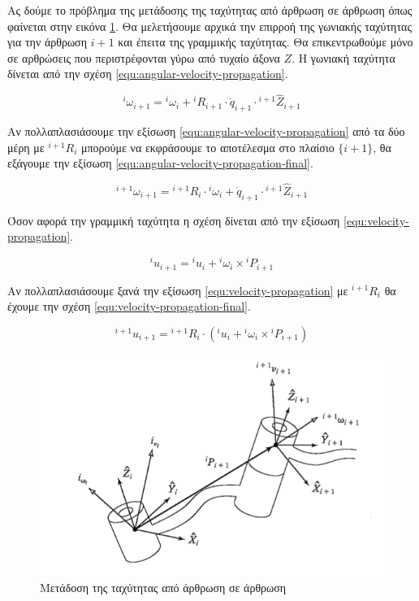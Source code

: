 Ας δούμε το πρόβλημα της μετάδοσης της ταχύτητας από άρθρωση σε άρθρωση όπως φαίνεται στην εικόνα \ref{fig:velocity-transfer}. Θα μελετήσουμε αρχικά την επιρροή της γωνιακής ταχύτητας για την άρθρωση $i+1$ και έπειτα της γραμμικής ταχύτητας. Θα επικεντρωθούμε μόνο σε αρθρώσεις που περιστρέφονται γύρω από τυχαίο άξονα $Ζ$. Η γωνιακή ταχύτητα δίνεται από την σχέση \ref{equ:angular-velocity-propagation}.

\begin{equation}
    ^i\omega_{i+1} = {}^i\omega_i + {}^iR_{i+1} \cdot \dot{q}_{i+1}
    \cdot {}^{i+1}\hat{Z}_{i+1}
    \label{equ:angular-velocity-propagation}
\end{equation}

Αν πολλαπλασιάσουμε την εξίσωση \ref{equ:angular-velocity-propagation} από τα δύο μέρη με $^{i+1}R_i$ μπορούμε να εκφράσουμε το αποτέλεσμα στο πλαίσιο $\{i+1\}$, θα εξάγουμε την εξίσωση \ref{equ:angular-velocity-propagation-final}.

\begin{equation}
    ^{i+1}\omega_{i+1} = {}^{i+1}R_i \cdot {}^i\omega_i + \dot{q}_{i+1}
    \cdot {}^{i+1}\hat{Z}_{i+1}
    \label{equ:angular-velocity-propagation-final}
\end{equation}

Όσον αφορά την γραμμική ταχύτητα η σχέση δίνεται από την εξίσωση \ref{equ:velocity-propagation}.

\begin{equation}
    ^iu_{i+1} = {}^iu_i + {}^i\omega_i \times {}^iP_{i+1}
    \label{equ:velocity-propagation}
\end{equation}

Αν πολλαπλασιάσουμε ξανά την εξίσωση \ref{equ:velocity-propagation} με $^{i+1}R_i$ θα έχουμε την σχέση \ref{equ:velocity-propagation-final}.

\begin{equation}
    ^{i+1}u_{i+1} = {}^{i+1}R_i \cdot (^iu_i + {}^i\omega_i \times
    {}^iP_{i+1})
    \label{equ:velocity-propagation-final}
\end{equation}

\begin{figure}[H]
    \centering
    \includegraphics[width=.8\textwidth, keepaspectratio]{fig/velocity-transfer.png}
    \caption{Μετάδοση της ταχύτητας από άρθρωση σε άρθρωση \cite{craig95}}
    \label{fig:velocity-transfer}
\end{figure}


